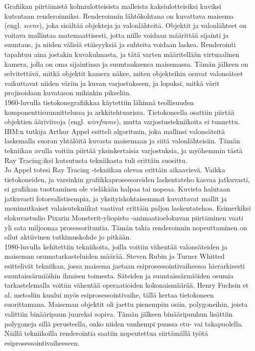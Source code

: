 \documentclass[a4paper,12pt, titlepage]{article}
\theoremstyle{break}
\begin{document}
Grafiikan piirtämistä kolmiulotteisista malleista kaksiulotteisiksi kuviksi kutsutaan renderoinniksi. Renderoinnin lähtökohtana on kuvattava maisema (engl. \emph{scene}), joka sisältää objekteja ja valonlähteitä. Objektit ja valonlähteet on voitava mallintaa matemaattisesti, jotta niille voidaan määrittää sijainti ja suuntaus, ja niiden välisiä etäisyyksiä ja suhteita voidaan laskea. Renderointi tapahtuu aina jostakin kuvakulmasta, ja tätä varten määritellään virtuaalinen kamera, jolla on oma sijaintinsa ja suuntauksensa maisemassa. Tämän jälkeen on selvitettävä, mitkä objektit kamera näkee, miten objekteihin osuvat valonsäteet vaikuttavat niiden väriin ja kuvan varjostukseen, ja lopuksi, mitkä värit projisoidaan kuvatason mihinkin pikseliin.\cite{janke}\\

1960-luvulla tietokonegrafiikkaa käytettiin lähinnä teollisuuden komponenttisuunnittelussa ja arkkitehtuurissa. Tietokoneella osattiin piirtää objektien ääriviivoja (engl. \emph{wireframe}), mutta varjostustekniikoita ei tunnettu. IBM:n tutkija Arthur Appel esitteli algoritmin, joka mallinsi valonsäteitä laskemalla suoran yhtälöitä kuvasta maisemaan ja siitä valonlähteisiin. Tämän tekniikan avulla voitiin piirtää yksinkertaisia varjostuksia, ja myöhemmin tästä Ray Tracing:iksi kutsutusta tekniikasta tuli erittäin suosittu.\cite{appel}\\

Jo Appel totesi Ray Tracing -tekniikan olevan erittäin aikaavievä.\cite{appel} Vaikka tietokoneiden, ja varsinkin grafiikkaprosessoreiden laskentateho kasvaa jatkuvasti, ei grafiikan tuottaminen ole vieläkään halpaa tai nopeaa. Kuvista halutaan jatkuvasti fotorealistisempia, ja yksityiskohtaisemmat kuvattavat mallit ja monimutkaiset valaisutekniikat vaativat erittäin paljon laskentatehoa. Esimerkiksi elokuvastudio Pixarin Monsterit-yliopisto -animaatioelokuvan piirtäminen vaati yli sata miljoonaa prosessorituntia.\cite{monsterit} Tämän takia renderoinnin nopeuttaminen on ollut aktiivinen tutkimuskohde jo pitkään.\\

1980-luvulla kehitettiin tekniikoita, joilla voitiin vähentää valonsäteiden ja maiseman osumatarkasteluiden määrää. Steven Rubin ja Turner Whitted esittelivät tekniikan, jossa maisema jaetaan esiprosessointivaiheessa hierarkisesti suuntaissärmiöihin ihmisen toimesta. Säteiden ja suuntaissärmiöiden osumia tarkastelemalla voitiin vähentää operaatioiden kokonaismäärää.\cite{rubin} Henry Fuchsin et al. metodiin kuului myös esiprosessointivaihe, tällä kertaa tietokoneen suorittamana. Maiseman objektit oli jaettu pienempiin osiin, polygoneihin, joista valittiin binääripuun juureksi sopiva. Tämän jälkeen binääripuuhun lisättiin polygoneja sillä perusteella, onko niiden vanhempi puussa etu- vai takapuolella. Näillä tekniikoilla renderointia saatiin nopeutettua siirtämällä työtä esiprosessointivaiheeseen.\cite{fuchs}  \\
\end{document}
